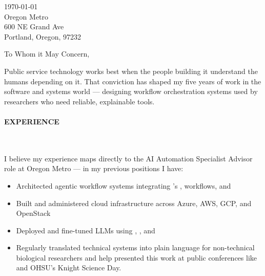 



\textcolor{my-grey}{\dotfill}
\bigbreak

{\today}\\
Oregon Metro\\
600 NE Grand Ave\\
Portland, Oregon, 97232

\vspace*{2\baselineskip}

To Whom it May Concern,

\vspace*{\baselineskip}

Public service technology works best when the people building it understand the humans depending on it. That conviction has shaped my five years of work in the software and systems world --- designing workflow orchestration systems used by researchers who need reliable, explainable tools.

\paragraph{EXPERIENCE}\

\vspace*{\baselineskip}

I believe my experience maps directly to the AI Automation Specialist Advisor role at Oregon Metro — in my previous positions I have:

\begin{itemize}

\item Architected agentic workflow systems integrating 's ,  workflows, and 

\item Built and administered cloud infrastructure across Azure, AWS, GCP, and OpenStack

\item Deployed and fine-tuned LLMs using , , and 

\item Regularly translated technical systems into plain language for non-technical biological researchers and help presented this work at public conferences like  and OHSU's Knight Science Day.

\end{itemize}

